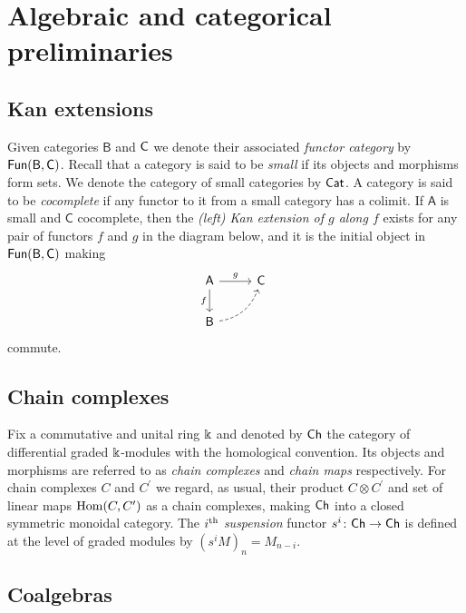 
\section{Algebraic and categorical preliminaries}

\subsection{Kan extensions}

Given categories $\mathsf{B}$ and $\mathsf{C}$ we denote their associated \textit{functor category} by $\mathsf{Fun}(\mathsf{B}, \mathsf{C})$.
Recall that a category is said to be \textit{small} if its objects and morphisms form sets.
We denote the category of small categories by $\mathsf{Cat}$.
A category is said to be \textit{cocomplete} if any functor to it from a small category has a colimit.
If $\mathsf{A}$ is small and $\mathsf{C}$ cocomplete, then the \textit{(left) Kan extension of $g$ along $f$} exists for any pair of functors $f$ and $g$ in the diagram below, and it is the initial object in $\mathsf{Fun}(\mathsf{B}, \mathsf{C})$ making
\begin{equation*}
\begin{tikzcd}[column sep=normal, row sep=normal]
\mathsf{A} \arrow[d, "f"'] \arrow[r, "g"] & \mathsf{C} \\ 
\mathsf{B} \arrow[dashed, ur, bend right] & \quad 
\end{tikzcd}
\end{equation*}
commute.

\subsection{Chain complexes}

Fix a commutative and unital ring $\Bbbk$ and denoted by $\mathsf{Ch}$ the category of differential graded $\Bbbk$-modules with the homological convention.
Its objects and morphisms are referred to as \textit{chain complexes} and \textit{chain maps} respectively.
For chain complexes $C$ and $C^\prime$ we regard, as usual, their product $C \otimes C^\prime$ and set of linear maps $\mathrm{Hom}(C, C^\prime)$ as a chain complexes, making $\mathsf{Ch}$ into a closed symmetric monoidal category.
The $i^\mathrm{th}$ \textit{suspension} functor $s^i \colon \mathsf{Ch} \to \mathsf{Ch}$ is defined at the level of graded modules by $(s^{i}M)_n = M_{n-i}$.

\subsection{Coalgebras} \label{ss:coalgebras}

